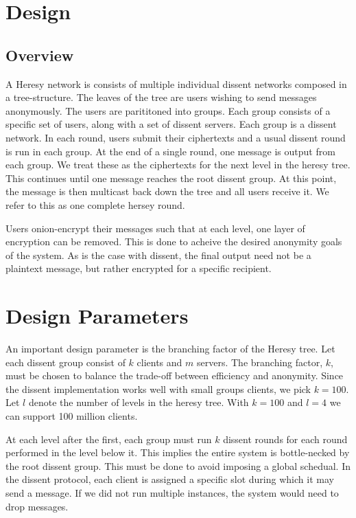 \section{Design}
\subsection{Overview}
A Heresy network is consists of multiple individual dissent networks composed in a tree-structure. The leaves of the tree are users wishing to send messages anonymously. The users are parititoned into groups. Each group consists of a specific set of users, along with a set of dissent servers. Each group is a dissent network. In each round, users submit their ciphertexts and a usual dissent round is run in each group. At the end of a single round, one message is output from each group. We treat these as the ciphertexts for the next level in the heresy tree. This continues until one message reaches the root dissent group. At this point, the message is then multicast back down the tree and all users receive it. We refer to this as one complete hersey round.

Users onion-encrypt their messages such that at each level, one layer of encryption can be removed. This is done to acheive the desired anonymity goals of the system. As is the case with dissent, the final output need not be a plaintext message, but rather encrypted for a specific recipient.

\section{Design Parameters}

An important design parameter is the branching factor of the Heresy tree. Let each dissent group consist of $k$ clients and $m$ servers. The branching factor, $k$, must be chosen to balance the trade-off between efficiency and anonymity. Since the dissent implementation works well with small groups clients, we pick $k=100$. Let $l$ denote the number of levels in the heresy tree. With $k=100$ and $l=4$ we can support 100 million clients.

At each level after the first, each group must run $k$ dissent rounds for each round performed in the level below it. This implies the entire system is bottle-necked by the root dissent group. This must be done to avoid imposing a global schedual. In the dissent protocol, each client is assigned a specific slot during which it may send a message. If we did not run multiple instances, the system would need to drop messages. 

